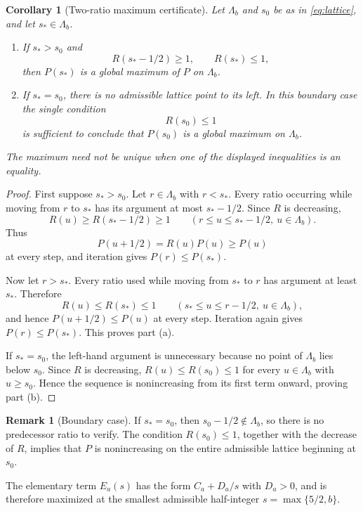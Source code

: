 \documentclass[11pt]{amsart}
\newtheorem{corollary}[theorem]{Corollary}
\theoremstyle{definition}
\newtheorem{remark}[theorem]{Remark}
\begin{document}
\begin{corollary}[Two-ratio maximum certificate]\label{cor:ratio}
Let $\Lambda_b$ and $s_0$ be as in \eqref{eq:lattice}, and let $s_\ast\in\Lambda_b$.
\begin{enumerate}[label=(\alph*),leftmargin=2.2em]
\item If $s_\ast>s_0$ and
\[
 R(s_\ast-1/2)\ge1,
 \qquad
 R(s_\ast)\le1,
\]
then $P(s_\ast)$ is a global maximum of $P$ on $\Lambda_b$.
\item If $s_\ast=s_0$, there is no admissible lattice point to its left.  In this boundary case the single condition
\[
 R(s_0)\le1
\]
is sufficient to conclude that $P(s_0)$ is a global maximum on $\Lambda_b$.
\end{enumerate}
The maximum need not be unique when one of the displayed inequalities is an equality.
\end{corollary}

\begin{proof}
First suppose $s_\ast>s_0$.  Let $r\in\Lambda_b$ with $r<s_\ast$.  Every ratio occurring while moving from $r$ to $s_\ast$ has its argument at most $s_\ast-1/2$.  Since $R$ is decreasing,
\[
 R(u)\ge R(s_\ast-1/2)\ge1
 \qquad
 (r\le u\le s_\ast-1/2,
 \ u\in\Lambda_b).
\]
Thus
\[
 P(u+1/2)=R(u)P(u)\ge P(u)
\]
at every step, and iteration gives $P(r)\le P(s_\ast)$.

Now let $r>s_\ast$.  Every ratio used while moving from $s_\ast$ to $r$ has argument at least $s_\ast$.  Therefore
\[
 R(u)\le R(s_\ast)\le1
 \qquad
 (s_\ast\le u\le r-1/2,
 \ u\in\Lambda_b),
\]
and hence $P(u+1/2)\le P(u)$ at every step.  Iteration again gives $P(r)\le P(s_\ast)$.  This proves part (a).

If $s_\ast=s_0$, the left-hand argument is unnecessary because no point of $\Lambda_b$ lies below $s_0$.  Since $R$ is decreasing, $R(u)\le R(s_0)\le1$ for every $u\in\Lambda_b$ with $u\ge s_0$.  Hence the sequence is nonincreasing from its first term onward, proving part (b).
\end{proof}

\begin{remark}[Boundary case]\label{rem:left-endpoint}
If $s_\ast=s_0$, then $s_0-1/2\notin\Lambda_b$, so there is no predecessor ratio to verify.  The condition $R(s_0)\le1$, together with the decrease of $R$, implies that $P$ is nonincreasing on the entire admissible lattice beginning at $s_0$.
\end{remark}

The elementary term $E_a(s)$ has the form $C_a+D_a/s$ with $D_a>0$, and is therefore maximized at the smallest admissible half-integer $s=\max\{5/2,b\}$.
\end{document}
